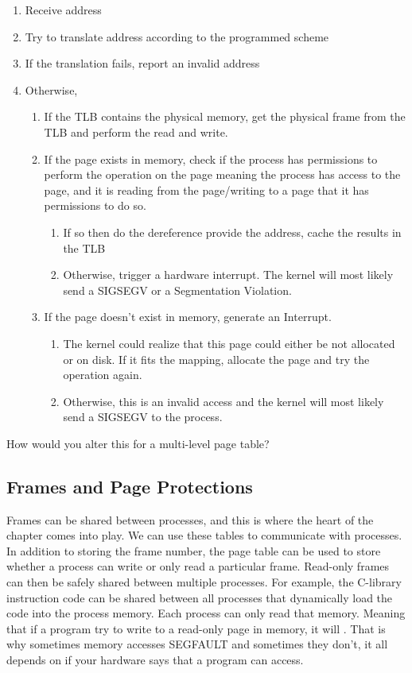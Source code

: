 \begin{enumerate}
\item Receive address
\item Try to translate address according to the programmed scheme
\item If the translation fails, report an invalid address
\item Otherwise,
	\begin{enumerate}
  \item If the TLB contains the physical memory, get the physical frame from the TLB and perform the read and write.
	\item If the page exists in memory, check if the process has permissions
		to perform the operation on the page meaning the process has access
		to the page, and it is reading from the page/writing to a page
		that it has permissions to do so.
		\begin{enumerate}
		\item If so then do the dereference provide the address, cache the results in the TLB
		\item Otherwise, trigger a hardware interrupt. The kernel
			will most likely send a SIGSEGV or a Segmentation Violation.
		\end{enumerate}
	\item If the page doesn't exist in memory, generate an Interrupt.
		\begin{enumerate}
		\item The kernel could realize that this page could either be not
			allocated or on disk.
      If it fits the mapping, allocate the page and try the operation again.
		\item Otherwise, this is an invalid access and the kernel will most likely send a SIGSEGV to the process.
		\end{enumerate}
	\end{enumerate}
\end{enumerate}

How would you alter this for a multi-level page table?

\subsection{Frames and Page Protections}

Frames can be shared between processes, and this is where the heart of the chapter comes into play.
We can use these tables to communicate with processes.
In addition to storing the frame number, the page table can be used to store whether a process can write or only read a particular frame.
Read-only frames can then be safely shared between multiple processes.
For example, the C-library instruction code can be shared between all processes that dynamically load the code into the process memory.
Each process can only read that memory.
Meaning that if a program try to write to a read-only page in memory, it will .
That is why sometimes memory accesses SEGFAULT and sometimes they don't, it all depends on if your hardware says that a program can access.

